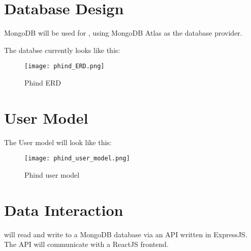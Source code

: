 \section{Database Design}
MongoDB will be used for \serviceName, using MongoDB Atlas as the database provider.

The databse currently looks like this:
\begin{figure}[ht]
    \centering
    \texttt{[image: phind\_ERD.png]}
    \caption{Phind ERD}
    \label{}
\end{figure}

\section{User Model}
The User model will look like this:

\begin{figure}[ht]
    \centering
    \texttt{[image: phind\_user\_model.png]}
    \caption{Phind user model}
    \label{find use}
\end{figure}

\section{Data Interaction}
\serviceName will read and write to a MongoDB database via an API written in ExpressJS. The API will communicate
with a ReactJS frontend.